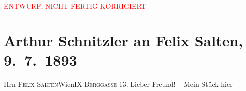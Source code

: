 
\begin{center}
            \textcolor{red}{ENTWURF, NICHT FERTIG KORRIGIERT}
                      \end{center}
            
         
         \renewcommand{\erwaehntePersonen}{Personen: Franz von Aichelburg-Labia, Richard Beer-Hofmann, Johannes Brahms, Bertha Flegmann, Marie Glümer, Marie Griebl, Emil Höfer, Josef Jarno, Felix Salten, Grethe Wreden}
         \renewcommand{\erwaehnteInstitutionen}{Institutionen: Volkstheater}
         \renewcommand{\erwaehnteOrte}{Orte: Berggasse, Gmunden, Wien}
         \renewcommand{\erwaehnteWerke}{Werke: Abschiedssouper, Die Frage an das Schicksal}
               \section[Arthur Schnitzler an Felix Salten, 9. 7. 1893]{ Arthur Schnitzler an Felix Salten, 9. 7. 1893}\nopagebreak{}\rehead{ }\begin{ledgroupsized}[t]{13cm}\normalsize\beginnumbering \toendnotes[C]{\smallbreak\pagebreak[2]} 
\toendnotes[C]{\smallbreak}\pstart{}{\pb}Hrn \textsc{Felix
                     Salten}\pend{}\pstart{}Wien\pend{}\pstart{}\textsc{IX Berggasse 13}.\pend{}{\bigskip}\pstart
           \noindent{}{\pb}Lieber Freund! – Mein Stück hier

\end{ledgroupsized}
